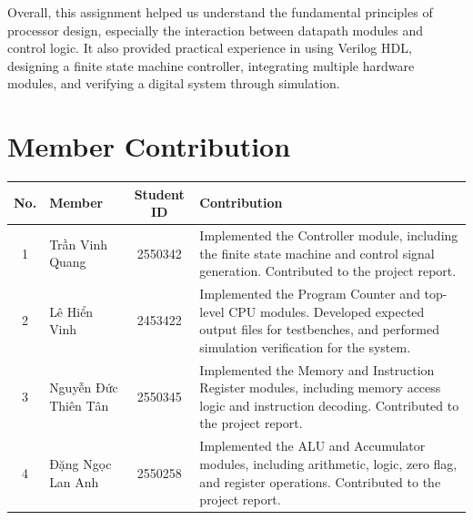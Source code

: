 Overall, this assignment helped us understand the fundamental principles of processor design, especially the interaction between datapath modules and control logic. It also provided practical experience in using Verilog HDL, designing a finite state machine controller, integrating multiple hardware modules, and verifying a digital system through simulation.

\newpage{}
\section{Member Contribution}
\begin{table}[H]
	\centering
	\begin{tabular}{|c|l|c|p{7.5cm}|}
		\hline
		\textbf{No.} & \textbf{Member}      & \textbf{Student ID} & \textbf{Contribution}                                                                                                                                        \\
		\hline
		1            & Trần Vinh Quang      & 2550342             & Implemented the Controller module, including the finite state machine and control signal generation. \newline Contributed to the project report.             \\
		\hline
		2            & Lê Hiển Vinh         & 2453422             & Implemented the Program Counter and top-level CPU modules.
		\newline Developed expected output files for testbenches, and performed simulation verification for the system.                                                                                                          \\
		\hline
		3            & Nguyễn Đức Thiên Tân & 2550345             & Implemented the Memory and Instruction Register modules, including memory access logic and instruction decoding. \newline Contributed to the project report. \\
		\hline
		4            & Đặng Ngọc Lan Anh    & 2550258             & Implemented the ALU and Accumulator modules, including arithmetic, logic, zero flag, and register operations. \newline Contributed to the project report.    \\
		\hline
	\end{tabular}
\end{table}
